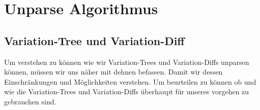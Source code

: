 \chapter{Unparse Algorithmus}

\section{Variation-Tree und Variation-Diff}

Um verstehen zu können wie wir Variation-Trees und Variation-Diffs unparsen können, müssen wir uns näher mit dehnen befassen. Damit wir dessen Einschränkungen und Möglichkeiten verstehen. Um beurteilen zu können ob und wie die Variation-Trees und Variation-Diffs überhaupt für unseres vorgehen zu gebrauchen sind.\\


